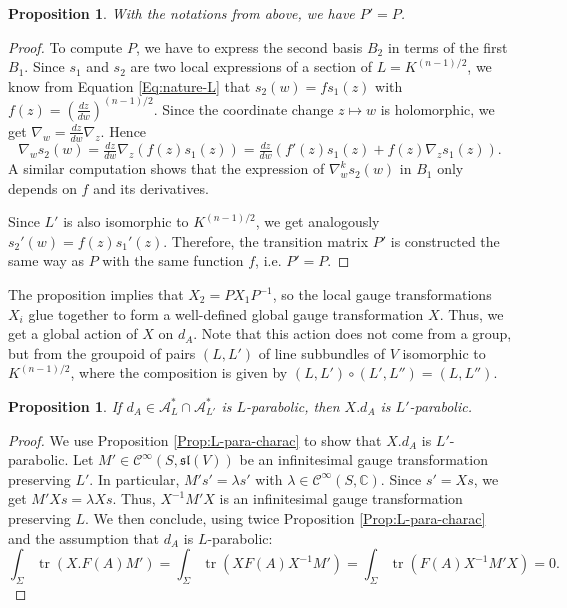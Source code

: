 \documentclass[11pt]{amsart}
\newtheorem{prop}[thm]{Proposition}
\numberwithin{thm}{section} %
\numberwithin{equation}{section} %
\numberwithin{figure}{section} %
\newcommand*{\C}{\mathbb{C}}
\DeclareMathOperator{\tr}{tr}
\begin{document}
\begin{prop}
With the notations from above, we have $P'=P$. 
\end{prop}

\begin{proof}
To compute $P$, we have to express the second basis $B_2$ in terms of the first $B_1$. Since $s_1$ and $s_2$ are two local expressions of a section of $L=K^{(n-1)/2}$, we know from Equation \eqref{Eq:nature-L} that $s_2(w)=fs_1(z)$ with $f(z)=\left(\tfrac{dz}{dw}\right)^{(n-1)/2}$. 
Since the coordinate change $z\mapsto w$ is holomorphic, we get $\nabla_w=\tfrac{dz}{dw}\nabla_z$. Hence $$\nabla_ws_2(w)=\tfrac{dz}{dw}\nabla_z(f(z)s_1(z))=\tfrac{dz}{dw}(f'(z)s_1(z)+f(z)\nabla_zs_1(z)).$$
A similar computation shows that the expression of $\nabla_w^{k}s_2(w)$ in $B_1$ only depends on $f$ and its derivatives.

Since $L'$ is also isomorphic to $K^{(n-1)/2}$, we get analogously $s_2'(w)=f(z)s_1'(z)$. Therefore, the transition matrix $P'$ is constructed the same way as $P$ with the same function $f$, i.e. $P'=P$.
\end{proof}

The proposition implies that $X_2=PX_1P^{-1}$, so the local gauge transformations $X_i$ glue together to form a well-defined global gauge transformation $X$. Thus, we get a global action of $X$ on $d_A$. Note that this action does not come from a group, but from the groupoid of pairs $(L,L')$ of line subbundles of $V$ isomorphic to $K^{(n-1)/2}$, where the composition is given by $(L,L')\circ (L',L'')=(L,L'')$.

\begin{prop}
If $d_A\in \mathcal{A}^*_L\cap\mathcal{A}^*_{L'}$ is $L$-parabolic, then $X.d_A$ is $L'$-parabolic.
\end{prop}
\begin{proof}
We use Proposition \ref{Prop:L-para-charac} to show that $X.d_A$ is $L'$-parabolic. Let $M'\in\mathcal{C}^\infty(S,\mathfrak{sl}(V))$ be an infinitesimal gauge transformation preserving $L'$. In particular, $M's'=\lambda s'$ with $\lambda\in\mathcal{C}^\infty(S,\C)$. Since $s'=Xs$, we get $M'Xs=\lambda Xs$. Thus, $X^{-1}M'X$ is an infinitesimal gauge transformation preserving $L$. We then conclude, using twice Proposition \ref{Prop:L-para-charac} and the assumption that $d_A$ is $L$-parabolic:
$$\int_\Sigma \tr(X.F(A) M') = \int_\Sigma \tr(XF(A)X^{-1}M')= \int_\Sigma \tr(F(A)X^{-1}M'X) =0.$$
\end{proof}
\end{document}

